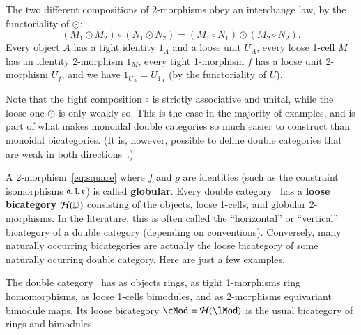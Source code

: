 The two different compositions of 2-morphisms obey an interchange law,
by the functoriality of $\odot$:
\[(M_1\odot M_2) \circ (N_1\odot N_2) = (M_1\circ N_1)\odot (M_2\circ N_2).
\]
Every object $A$ has a tight identity $1_A$ and a loose unit
$U_A$, every loose 1-cell $M$ has an identity 2-morphism $1_M$, every
tight 1-morphism $f$ has a loose unit 2-morphism $U_f$, and we
have $1_{U_A} = U_{1_A}$ (by the functoriality of $U$).

Note that the tight composition $\circ$ is strictly associative and
unital, while the loose one $\odot$ is only weakly so.  This is
the case in the majority of examples, and is part of what makes monoidal double categories so much easier to construct than monoidal bicategories.
(It is, however, possible to define double categories that are weak in both directions~\cite{verity:base-change}.)



A 2-morphism~\eqref{eq:square} where $f$ and $g$ are identities (such
as the constraint isomorphisms $\mathfrak{a},\mathfrak{l},\mathfrak{r}$) is called
\textbf{globular}.  Every double category \lD\ has a
\textbf{loose bicategory} $\mathcal{H}(\mathbb{D})$ consisting of the objects,
loose 1-cells, and globular 2-morphisms.  In the literature, this is often called the ``horizontal'' or ``vertical'' bicategory of a double category (depending on conventions). Conversely, many naturally
occurring bicategories are actually the loose bicategory of some
naturally ocurring double category.  Here are just a few examples.

\begin{eg}
  The double category \lMod\ has as objects rings, as tight 1-morphisms ring
  homomorphisms, as loose 1-cells bimodules, and as 2-morphisms equivariant
  bimodule maps.  Its loose bicategory $\cMod = \cH(\lMod)$ is
  the usual bicategory of rings and bimodules.%
\end{eg}

